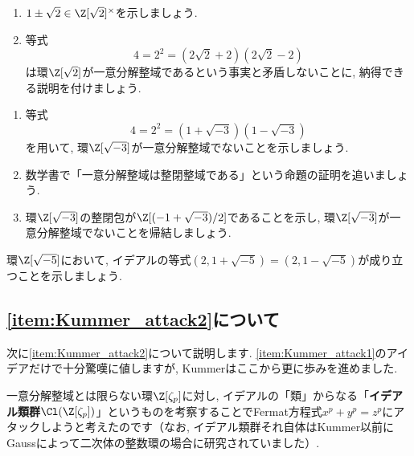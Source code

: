 \documentclass[11pt,b5paper,oneside,titlepage,lualatex]{ltjsreport}
\numberwithin{equation}{section} %
\begin{document}
\begin{exc}{}{}
	\begin{enumerate}
		\item $ 1 \pm \sqrt{2} \in \Z[\sqrt{2}]^\times $を示しましょう. 
		\item 等式
		\[
		4 = 2^2 = (2\sqrt{2} + 2) (2\sqrt{2} - 2)
		\]
		は環$ \Z[\sqrt{2}] $が一意分解整域であるという事実と矛盾しないことに, 納得できる説明を付けましょう. 
	\end{enumerate}
\end{exc}

\begin{exc}{}{}
	\begin{enumerate}
		\item 等式
		\[
		4 = 2^2 = (1 + \sqrt{-3}) (1 - \sqrt{-3})
		\]
		を用いて, 環$ \Z[\sqrt{-3}] $が一意分解整域でないことを示しましょう. 
		\item 数学書で「一意分解整域は整閉整域である」という命題の証明を追いましょう. 
		\item 環$ \Z[\sqrt{-3}] $の整閉包が$ \Z[(-1 + \sqrt{-3})/2] $であることを示し, 環$ \Z[\sqrt{-3}] $が一意分解整域でないことを帰結しましょう. 
	\end{enumerate}
\end{exc}

\begin{exc}{}{}
	環$ \Z[\sqrt{-5}] $において, イデアルの等式$ (2, 1 + \sqrt{-5}) = (2, 1 - \sqrt{-5}) $が成り立つことを示しましょう. 
\end{exc}



\subsection{\ref{item:Kummer_attack2}について}


次に\ref{item:Kummer_attack2}について説明します. 
\ref{item:Kummer_attack1}のアイデアだけで十分驚嘆に値しますが, Kummerはここから更に歩みを進めました. 

一意分解整域とは限らない環$ \Z[\zeta_p] $に対し, イデアルの「類」からなる「\textbf{イデアル類群}$ \Cl(\Z[\zeta_p]) $」というものを考察することでFermat方程式$ x^p + y^p = z^p $にアタックしようと考えたのです（なお, イデアル類群それ自体はKummer以前にGaussによって二次体の整数環の場合に研究されていました）. 
\end{document}
